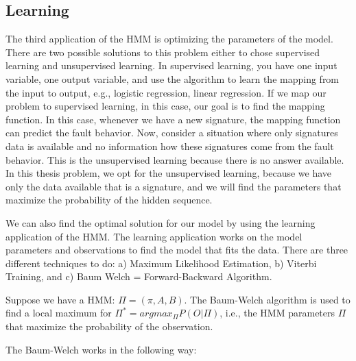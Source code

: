 \subsection{Learning}

The third application of the HMM is optimizing the parameters of the model. There are two possible solutions to this problem either to chose supervised learning and unsupervised learning.  In supervised learning, you have one input variable, one output variable, and use the algorithm to learn the mapping from the input to output, e.g., logistic regression, linear regression. If we  map our problem to supervised learning, in this case, our goal is to find the mapping function. In this case, whenever we have a new signature, the mapping function can predict the fault behavior. Now, consider a situation where only signatures data is available and no information how these signatures come from the fault behavior.  This is the unsupervised learning because there is no answer available. In this thesis problem, we opt for the unsupervised learning, because we have only the data available that is a signature, and we will find the parameters that maximize the probability of the hidden sequence.  

We can also find the optimal solution for our model by using the learning application of the HMM. The learning application works on the model parameters and observations to find the model that fits the data. There are three different techniques to do: a) Maximum Likelihood Estimation, b) Viterbi Training, and c) Baum  Welch = Forward-Backward Algorithm. 


Suppose we have a HMM: $\Pi = (\pi, A, B)$. The Baum-Welch algorithm is used to find  a local maximum for $\Pi^* = arg max_{\Pi} P (O | \Pi)$, i.e., the HMM parameters $\Pi$ that maximize the probability of the observation.

The Baum-Welch works in the following way:

